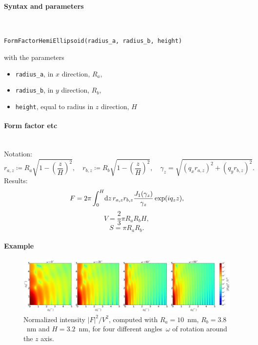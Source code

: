 \paragraph{Syntax and parameters}\strut\\[-2ex plus .2ex minus .2ex]
\begin{lstlisting}[language=python, style=eclipseboxed,numbers=none,nolol]
  FormFactorHemiEllipsoid(radius_a, radius_b, height)
\end{lstlisting}
with the parameters
\begin{itemize}
\item \texttt{radius\_a}, in $x$ direction, $R_a$,
\item \texttt{radius\_b}, in $y$ direction, $R_b$,
\item \texttt{height}, equal to radius in $z$ direction, $H$
\end{itemize}


\paragraph{Form factor etc}\strut\\
Notation:
\begin{equation*}
 r_{a,z} \coloneqq R_a \sqrt{1-\left(\dfrac{z}{H} \right)^2},\quad
 r_{b,z} \coloneqq R_b \sqrt{1-\left(\dfrac{z}{H} \right)^2}, \quad
 \gamma_z =\sqrt{(q_x r_{a,z})^2+(q_y r_{b,z})^2}.
\end{equation*}
Results:
\begin{equation*}
  F = 2\pi \int_0^{H} \!\text{d} z\, r_{a,z} r_{b,z}
                               \frac{J_1(\gamma_z)}{\gamma_z}\exp(iq_z z),
\end{equation*}
\begin{equation*}
  V = \dfrac{2}{3}\pi R_a R_bH,
\end{equation*}
\begin{equation*}
  S =\pi R_a R_b.
\end{equation*}

\paragraph{Example}\strut

\begin{figure}[H]
\begin{center}
\includegraphics[width=\textwidth]{fig/ff2/ff_HemiEllipsoid.pdf}
\end{center}
\caption{Normalized intensity $|F|^2/V^2$,
computed with $R_a=10$~nm, $R_b=3.8$~nm and $H=3.2$~nm,
for four different angles~$\omega$ of rotation around the $z$ axis.}
\end{figure}

